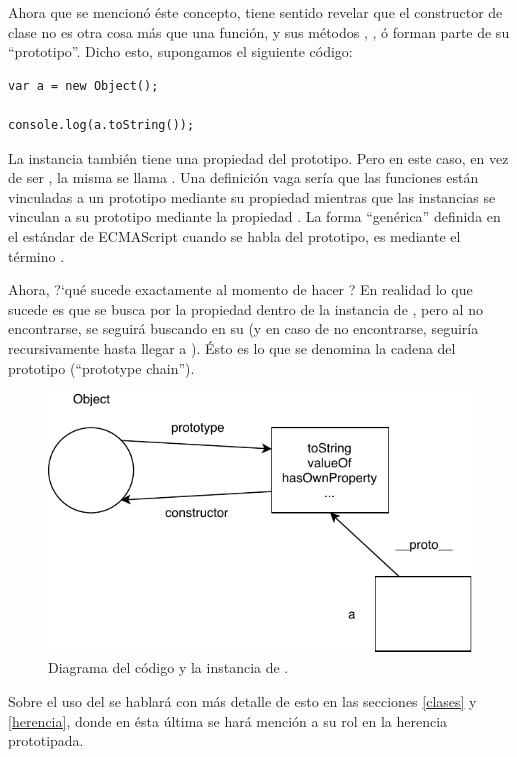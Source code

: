Ahora que se mencionó éste concepto, tiene sentido revelar que el constructor de clase  no es otra cosa más que una función, y sus métodos , , ó  forman parte de su "`prototipo"'. Dicho esto, supongamos el siguiente código:

\begin{lstlisting}
var a = new Object();

console.log(a.toString());
\end{lstlisting}

La instancia  también tiene una propiedad del prototipo. Pero en este caso, en vez de ser , la misma se llama . Una definición vaga sería que las funciones están vinculadas a un prototipo mediante su propiedad  mientras que las instancias se vinculan a su prototipo mediante la propiedad . La forma "`genérica"' definida en el estándar de ECMAScript cuando se habla del prototipo, es mediante el término \code{[[Prototype]]}.

Ahora, ?`qué sucede exactamente al momento de hacer ? En realidad lo que sucede es que se busca por la propiedad  dentro de la instancia de , pero al no encontrarse, se seguirá buscando en su \code{[[Prototype]]} (y en caso de no encontrarse, seguiría recursivamente hasta llegar a ). Ésto es lo que se denomina la cadena del prototipo ("`prototype chain"').

\begin{figure}[H]
\centering
\includegraphics{Figures/Prototype2}
\decoRule
\caption[]{Diagrama del código y la instancia de .}
\label{fig:prototype2}
\end{figure}

Sobre el uso del  se hablará con más detalle de esto en las secciones \ref{clases} y \ref{herencia}, donde en ésta última se hará mención a su rol en la herencia prototipada.